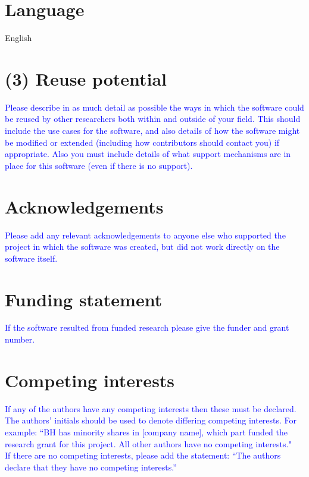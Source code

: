 \documentclass{jors}
\begin{document}
\section*{Language}

English

\section*{(3) Reuse potential}

\textcolor{blue}{Please describe in as much detail as possible the ways in which the software could be reused by other researchers both within and outside of your field. This should include the use cases for the software, and also details of how the software might be modified or extended (including how contributors should contact you) if appropriate. Also you must include details of what support mechanisms are in place for this software (even if there is no support).}

\section*{Acknowledgements}

\textcolor{blue}{Please add any relevant acknowledgements to anyone else who supported the project in which the software was created, but did not work directly on the software itself.}

\section*{Funding statement}

\textcolor{blue}{If the software resulted from funded research please give the funder and grant number.}

\section*{Competing interests}

\textcolor{blue}{If any of the authors have any competing interests then these must be declared. The authors’ initials should be used to denote differing competing interests. For example: “BH has minority shares in [company name], which part funded the research grant for this project. All other authors have no competing interests." \\
If there are no competing interests, please add the statement:
“The authors declare that they have no competing interests.” }
\end{document}
